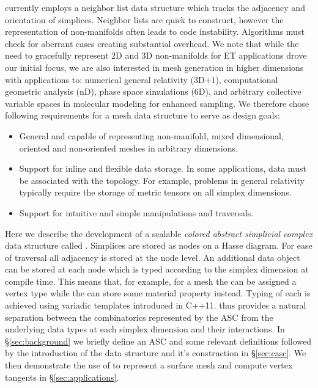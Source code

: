 \par \gamer currently employs a neighbor list data structure which tracks the adjacency and orientation of simplices.
Neighbor lists are quick to construct, however the representation of non-manifolds often leads to code instability.
Algorithms must check for aberrant cases creating substantial overhead.
We note that while the need to gracefully represent 2D and 3D non-manifolds for ET applications drove our initial focus, we are also interested in mesh generation in higher dimensions with applications to:
numerical general relativity (3D+1)\cite{HSTV16a,Regge1961}, computational geometric analysis (nD)\cite{HoTi14a}, phase space simulations (6D), and arbitrary collective variable spaces in molecular modeling for enhanced sampling\cite{Vanden-Eijnden2009d}.
We therefore chose following requirements for a mesh data structure to serve as design goals:
\begin{itemize}
    \item General and capable of representing non-manifold, mixed dimensional, oriented and non-oriented meshes in arbitrary dimensions.
    \item Support for inline and flexible data storage. In some applications, data must be associated with the topology. For example, problems in general relativity typically require the storage of metric tensors on all simplex dimensions.
    \item Support for intuitive and simple manipulations and traversals.
\end{itemize}

\par Here we describe the development of a scalable \textit{colored abstract simplicial complex} data structure called \asc.
Simplices are stored as nodes on a Hasse diagram.
For ease of traversal all adjacency is stored at the node level.
An additional data object can be stored at each node which is typed according to the simplex dimension at compile time.
This means that, for example, for a mesh the  can be assigned a vertex type while the  can store some material property instead.
Typing of each  is achieved using variadic templates introduced in C++11.
\asc thus provides a natural separation between the combinatorics represented by the ASC from the underlying data types at each simplex dimension and their interactions.
In \S\ref{sec:background} we briefly define an ASC and some relevant definitions followed by the introduction of the \asc data structure and it's construction in \S\ref{sec:casc}.
We then demonstrate the use of \asc to represent a surface mesh and compute vertex tangents in \S\ref{sec:applications}.

